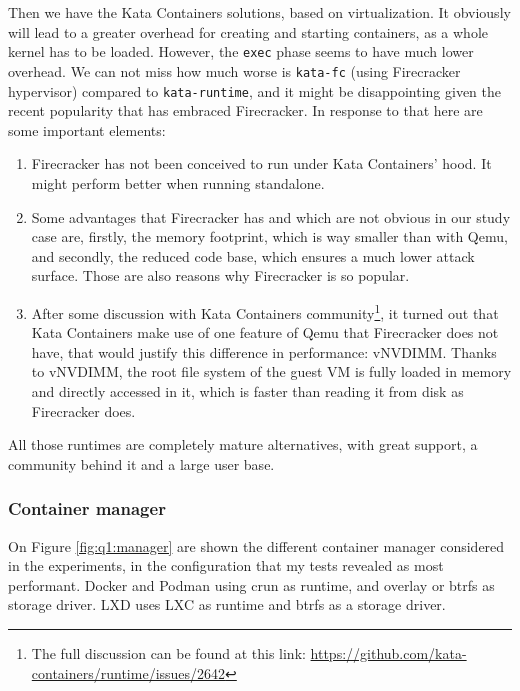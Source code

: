 Then we have the Kata Containers solutions, based on virtualization.  It obviously will lead to a greater overhead for creating and starting containers, as a whole kernel has to be loaded.  However, the \texttt{exec} phase seems to have much lower overhead.  We can not miss how much worse is \texttt{kata-fc} (using Firecracker hypervisor) compared to \texttt{kata-runtime}, and it might be disappointing given the recent popularity that has embraced Firecracker.  In response to that here are some important elements:
\begin{enumerate}
  \item Firecracker has not been conceived to run under Kata Containers' hood.  It might perform better when running standalone.
  \item Some advantages that Firecracker has and which are not obvious in our study case are, firstly, the memory footprint, which is way smaller than with Qemu, and secondly, the reduced code base, which ensures a much lower attack surface.  Those are also reasons why Firecracker is so popular.
  \item After some discussion with Kata Containers community\footnote{The full discussion can be found at this link: \href{https://github.com/kata-containers/runtime/issues/2642}{https://github.com/kata-containers/runtime/issues/2642}}, it turned out that Kata Containers make use of one feature of Qemu that Firecracker does not have, that would justify this difference in performance: vNVDIMM.  Thanks to vNVDIMM, the root file system of the guest VM is fully loaded in memory and directly accessed in it, which is faster than reading it from disk as Firecracker does.
\end{enumerate}

All those runtimes are completely mature alternatives, with great support, a community behind it and a large user base.  

\subsubsection{Container manager}

On Figure \ref{fig:q1:manager} are shown the different container manager considered in the experiments, in the configuration that my tests revealed as most performant.  Docker and Podman using crun as runtime, and overlay or btrfs as storage driver.  LXD uses LXC as runtime and btrfs as a storage driver.

